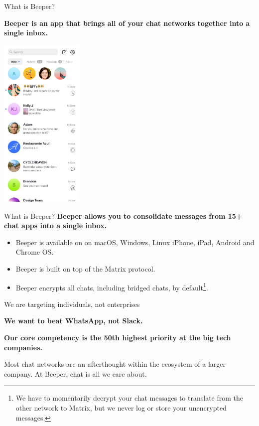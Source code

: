 \documentclass{beeper}
\begin{document}
\begin{frame}{What is Beeper?}
    \begin{center}
        \textbf{Beeper is an app that brings all of your chat networks together into
            a single inbox.}
    \end{center}
    \centerline{\includegraphics[width=0.3\textwidth]{images/beeper-mobile}}
\end{frame}

\begin{frame}{What is Beeper?}
    \textbf{Beeper allows you to consolidate messages from 15+ chat apps into a
        single inbox.}

    \pause
    \begin{itemize}
        \item Beeper is available on on macOS, Windows, Linux iPhone, iPad,
            Android and Chrome OS.
        \item Beeper is built on top of the Matrix protocol.
        \item Beeper encrypts all chats, including bridged chats, by
            default\footnote[frame]{We have to momentarily decrypt your chat
            messages to translate from the other network to Matrix, but we never
            log or store your unencrypted messages.}.
    \end{itemize}
\end{frame}

\begin{frame}{We are targeting individuals, not enterprises}
    \begin{center}
        \textbf{\Large We want to beat WhatsApp, not Slack.}
        \vspace{1cm}
        \pause

        \textbf{\large Our core competency is the 50th highest priority at the
        big tech companies.}

        Most chat networks are an afterthought within the ecosystem of a larger
        company. At Beeper, chat is all we care about.
    \end{center}
\end{frame}
\end{document}
